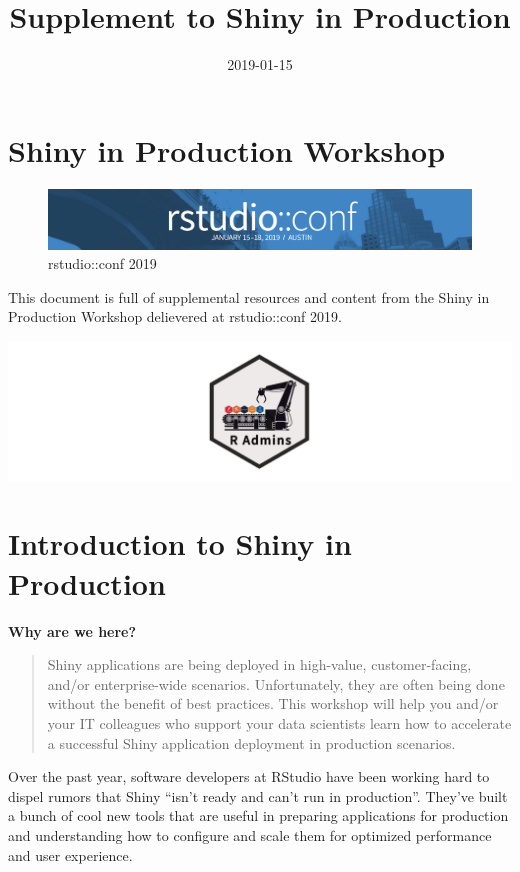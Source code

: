 \documentclass[]{book}
\title{Supplement to Shiny in Production}
\author{}
\date{2019-01-15}
\theoremstyle{definition}
\theoremstyle{definition}
\theoremstyle{definition}
\theoremstyle{remark}
\begin{document}
\maketitle

{
\setcounter{tocdepth}{1}
\tableofcontents
}
\hypertarget{shiny-in-production-workshop}{%
\chapter{Shiny in Production
Workshop}\label{shiny-in-production-workshop}}

\begin{figure}
\centering
\includegraphics{imgs/conf-banner.png}
\caption{rstudio::conf 2019}
\end{figure}

This document is full of supplemental resources and content from the
Shiny in Production Workshop delievered at rstudio::conf 2019.

\includegraphics{imgs/radmins-banner.png}

\hypertarget{course-intro}{%
\chapter{Introduction to Shiny in Production}\label{course-intro}}

\textbf{Why are we here?}

\begin{quote}
Shiny applications are being deployed in high-value, customer-facing,
and/or enterprise-wide scenarios. Unfortunately, they are often being
done without the benefit of best practices. This workshop will help you
and/or your IT colleagues who support your data scientists learn how to
accelerate a successful Shiny application deployment in production
scenarios.
\end{quote}

Over the past year, software developers at RStudio have been working
hard to dispel rumors that Shiny ``isn't ready and can't run in
production''. They've built a bunch of cool new tools that are useful in
preparing applications for production and understanding how to configure
and scale them for optimized performance and user experience.
\end{document}

